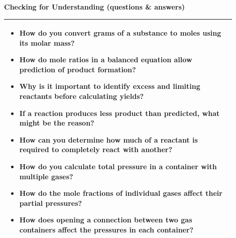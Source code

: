 \documentclass{article}
\begin{document}
\newpage
\noindent
{\large\textbf{Checking for Understanding (questions \& answers)} \\
\vspace{0.2cm}
\begin{tabular}{|p{0.9\linewidth}|}
\hline
\begin{itemize}
\item How do you convert grams of a substance to moles using its molar mass?
\item How do mole ratios in a balanced equation allow prediction of product formation?
\item Why is it important to identify excess and limiting reactants before calculating yields?
\item If a reaction produces less product than predicted, what might be the reason?
\item How can you determine how much of a reactant is required to completely react with another?
\item How do you calculate total pressure in a container with multiple gases?
\item How do the mole fractions of individual gases affect their partial pressures?
\item How does opening a connection between two gas containers affect the pressures in each container?
\end{itemize} \\
\hline
\end{tabular}

}
\end{document}
